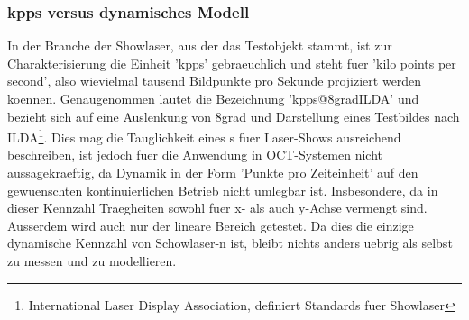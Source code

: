\subsubsection{	kpps versus dynamisches Modell}
In der Branche der Showlaser, aus der das Testobjekt stammt, ist zur Charakterisierung die Einheit 'kpps' gebraeuchlich und steht fuer 'kilo points per second', also wievielmal tausend Bildpunkte pro Sekunde projiziert werden koennen\cite{ildaHomepage}. Genaugenommen lautet die Bezeichnung 'kpps@8gradILDA' und bezieht sich auf eine Auslenkung von 8grad und Darstellung eines Testbildes nach ILDA\footnote{International Laser Display Association, definiert Standards fuer Showlaser}. Dies mag die Tauglichkeit eines \galvo s fuer Laser-Shows ausreichend beschreiben, ist jedoch fuer die Anwendung in OCT-Systemen nicht aussagekraeftig, da Dynamik in der Form 'Punkte pro Zeiteinheit' auf den gewuenschten kontinuierlichen Betrieb nicht umlegbar ist. Insbesondere, da in dieser Kennzahl Traegheiten sowohl fuer x- als auch y-Achse vermengt sind. Ausserdem wird auch nur der lineare Bereich getestet. Da dies die einzige dynamische Kennzahl von Schowlaser-\galvo n ist, bleibt nichts anders uebrig als selbst zu messen und zu modellieren.
